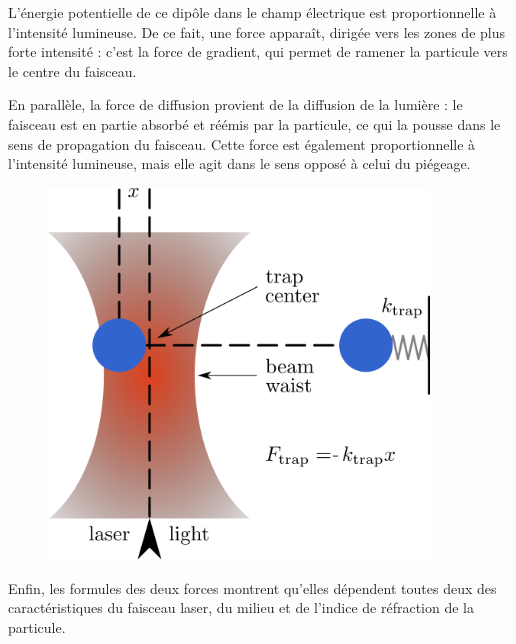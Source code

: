 \begin{minipage}[c]{0.55\textwidth}
    L'énergie potentielle de ce dipôle dans le champ électrique est proportionnelle à l'intensité lumineuse. De ce fait, une force apparaît, dirigée vers les zones de plus forte intensité : c'est la force de gradient, qui permet de ramener la particule vers le centre du faisceau.

    En parallèle, la force de diffusion provient de la diffusion de la lumière : le faisceau est en partie absorbé et réémis par la particule, ce qui la pousse dans le sens de propagation du faisceau. Cette force est également proportionnelle à l'intensité lumineuse, mais elle agit dans le sens opposé à celui du piégeage.
\end{minipage}\hfill
\begin{minipage}[c]{0.4\textwidth}
    \begin{figure}[H]
        \begin{center}
            \includegraphics[width=0.9\textwidth]{assets/figures/Introduction/optical_tweezer_theorie.png}
        \end{center}
        \label{optical_tweezer_theorie}
    \end{figure}
\end{minipage}

Enfin, les formules des deux forces montrent qu'elles dépendent toutes deux des caractéristiques du faisceau laser, du milieu et de l'indice de réfraction de la particule.

